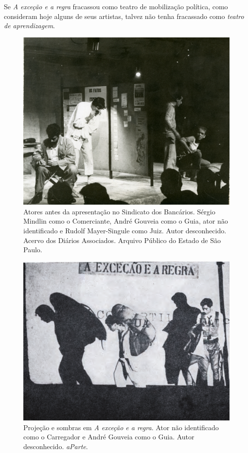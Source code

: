 Se \textit{A exceção e a regra} fracassou como teatro de mobilização
política, como consideram hoje alguns de seus artistas, talvez não tenha
fracassado como \textit{teatro de aprendizagem}.


\begin{figure}
\includegraphics[width=\columnwidth]{./media/IMAGEM8.png}
\caption{Atores antes da apresentação no Sindicato dos Bancários. Sérgio Mindlin
como o Comerciante, André Gouveia como o Guia, ator não identificado e
Rudolf Mayer-Singule como Juiz. Autor desconhecido. Acervo dos Diários
Associados. Arquivo Público do Estado de São Paulo.}
\end{figure}

\begin{figure}
\includegraphics[width=\columnwidth]{media/IMAGEM9.png}
\caption{Projeção e sombras em \textit{A exceção e a regra}. Ator não identificado
como o Carregador e André Gouveia como o Guia. Autor desconhecido.
\textit{aParte}.}
\end{figure}

